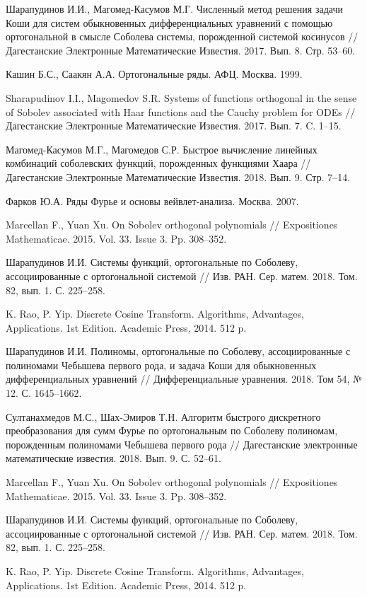 \begin{thebibliography}{111}
Шарапудинов И.И., Магомед-Касумов М.Г. Численный метод решения задачи Коши для систем обыкновенных дифференциальных уравнений с помощью ортогональной в смысле Соболева системы, порожденной системой косинусов // Дагестанские Электронные Математические Известия. 2017. Вып. 8. Стр. 53--60.

Кашин Б.С., Саакян А.А. Ортогональные ряды. АФЦ. Москва. 1999.

Sharapudinov I.I., Magomedov S.R. Systems of functions orthogonal in the sense of Sobolev associated with Haar functions and the Cauchy problem for ODEs // Дагестанские Электронные Математические Известия. 2017. Вып. 7. C. 1--15.

Магомед-Касумов М.Г., Магомедов С.Р. Быстрое вычисление линейных комбинаций соболевских функций, порожденных функциями Хаара // Дагестанские Электронные Математические Известия. 2018. Вып. 9. Стр. 7--14.

Фарков Ю.А. Ряды Фурье и основы вейвлет-анализа. Москва. 2007.


 Marcellan F., Yuan Xu. On Sobolev orthogonal polynomials // Expositiones Mathematicae. 2015. Vol. 33. Issue 3. Pp. 308--352.

Шарапудинов И.И. Системы функций, ортогональные по Соболеву, ассоциированные с ортогональной системой // Изв. РАН. Сер. матем. 2018. Том. 82, вып. 1. С. 225--258.

K. Rao, P. Yip. Discrete Cosine Transform. Algorithms, Advantages, Applications. 1st Edition. Academic Press, 2014. 512 p.


 Шарапудинов И.И. Полиномы, ортогональные по Соболеву, ассоциированные с полиномами Чебышева первого рода, и задача Коши для обыкновенных дифференциальных уравнений // Дифференциальные уравнения. 2018. Том 54, № 12. С. 1645--1662.

 Султанахмедов М.С., Шах-Эмиров Т.Н. Алгоритм быстрого дискретного преобразования для сумм Фурье по ортогональным по Соболеву полиномам, порожденным полиномами Чебышева первого рода // Дагестанские электронные математические известия. 2018. Вып. 9. С. 52--61.

 Marcellan F., Yuan Xu. On Sobolev orthogonal polynomials // Expositiones Mathematicae. 2015. Vol. 33. Issue 3. Pp. 308--352.

Шарапудинов И.И. Системы функций, ортогональные по Соболеву, ассоциированные с ортогональной системой // Изв. РАН. Сер. матем. 2018. Том. 82, вып. 1. С. 225--258.

K. Rao, P. Yip. Discrete Cosine Transform. Algorithms, Advantages, Applications. 1st Edition. Academic Press, 2014. 512 p.

\end{thebibliography}
